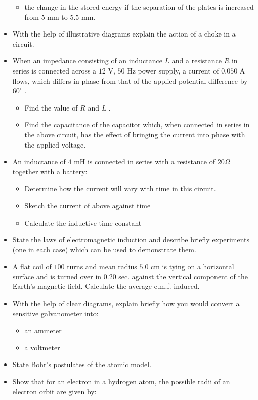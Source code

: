 \documentclass{article}
\begin{document}
\begin{itemize}
\begin{itemize}
\item the change in the stored energy if the separation of the plates is increased from $ 5$ mm to $ 5.5$ mm.
\end{itemize}
\item With the help of illustrative diagrams explain the action of a choke in a circuit.
\item When an impedance consisting of an inductance $ L$ and a resistance $ R$ in series is connected across a $ 12$ V, $ 50$ Hz power supply, a current of $ 0.050$ A flows, which differs in phase from that of the applied potential difference by $ 60^{\circ}$ .
 \begin{itemize}
\item Find the value of $ R$ and $ L$ .
\item Find the capacitance of the capacitor which, when connected in series in the above circuit, has the effect of bringing the current into phase with the applied voltage.
\end{itemize}
\item An inductance of $ 4$ mH is connected in series with a resistance of $ 20\Omega $ together with a battery:
 \begin{itemize}
\item Determine how the current will vary with time in this circuit.
\item Sketch the current of above against time
\item Calculate the inductive time constant
\end{itemize}
\item State the laws of electromagnetic induction and describe briefly experiments (one in each case) which can be used to demonstrate them.
\item A flat coil of $ 100$ turns and mean radius $ 5.0$ cm is tying on a horizontal surface and is turned over in $ 0.20$ sec. against the vertical component of the Earth's magnetic field. Calculate the average e.m.f. induced.
\item With the help of clear diagrams, explain briefly how you would convert a sensitive galvanometer into:
 \begin{itemize}
\item an ammeter
\item a voltmeter
\end{itemize}
\item State Bohr’s postulates of the atomic model.
\item Show that for an electron in a hydrogen atom, the possible radii of an electron orbit are given by:

\end{itemize}
\end{document}
